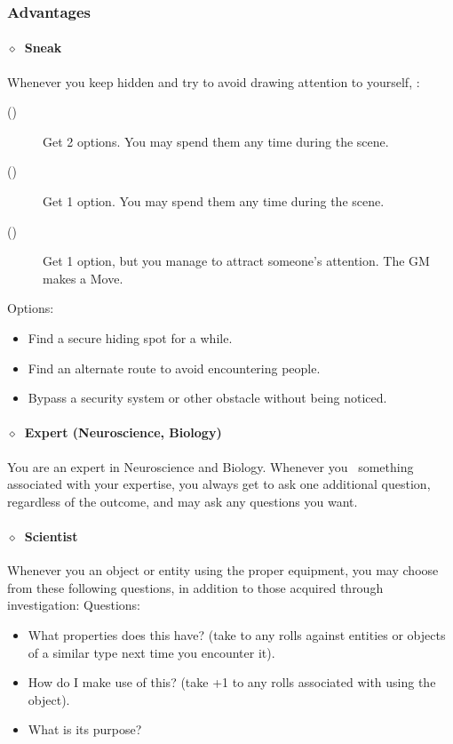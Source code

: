 \subsubsection{Advantages}%
\label{ssub:scientist_advantages}
\paragraph{\(\diamond\)~Sneak}%
Whenever you keep hidden and try to avoid drawing attention to yourself, :
\begin{description}
 \item[()] Get 2 options. You may spend them any time during the scene.
 \item[()] Get 1 option. You may spend them any time during the scene.
 \item[()] Get 1 option, but you manage to attract someone’s attention. The GM makes a Move.
\end{description}
Options:
\begin{itemize}
 \item Find a secure hiding spot for a while.
 \item Find an alternate route to avoid encountering people.
 \item Bypass a security system or other obstacle without being noticed.
\end{itemize}
\KULTrule%

\paragraph{\(\diamond\)~Expert (Neuroscience, Biology)}%
You are an expert in Neuroscience and Biology. Whenever you ~something
associated with your expertise, you always get to ask one additional question, regardless
of the outcome, and may ask any questions you want.
\KULTrule%

\paragraph{\(\diamond\)~Scientist}%
Whenever you  an object or entity using the proper equipment, you may choose from these following
questions, in addition to those acquired through investigation:
Questions:
\begin{itemize}
  \item What properties does this have? (take  to any rolls against entities or objects of a similar type next time you encounter it).
  \item How do I make use of this? (take +1 to any rolls associated with using the object).
  \item What is its purpose?
\end{itemize}
\KULTrule%



